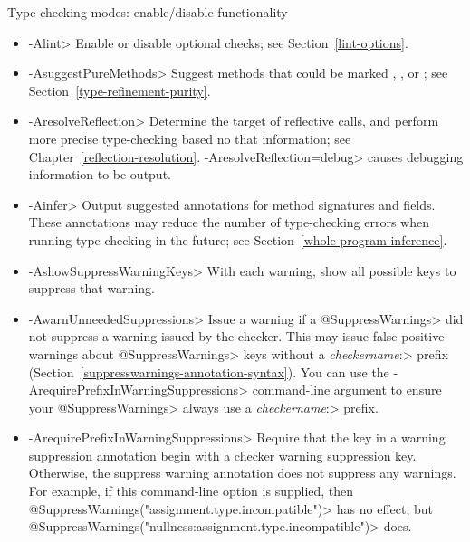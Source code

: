 Type-checking modes:  enable/disable functionality
\begin{itemize}
\item \<-Alint>
  Enable or disable optional checks; see Section~\ref{lint-options}.
\item \<-AsuggestPureMethods>
  Suggest methods that could be marked
  ,
  ,
  or ; see
  Section~\ref{type-refinement-purity}.
\item \<-AresolveReflection>
  Determine the target of reflective calls, and perform more precise
  type-checking based no that information; see
  Chapter~\ref{reflection-resolution}.  \<-AresolveReflection=debug> causes
  debugging information to be output.
\item \<-Ainfer>
  Output suggested annotations for method signatures and fields.
  These annotations may reduce the number of type-checking
  errors when running type-checking in the future; see
  Section~\ref{whole-program-inference}.
\item \<-AshowSuppressWarningKeys>
  With each warning, show all possible keys to suppress that warning.
\item \<-AwarnUnneededSuppressions>
  Issue a warning if a \<@SuppressWarnings> did not suppress a warning
  issued by the checker.  This may issue false positive warnings about
  \<@SuppressWarnings> keys without a \<\emph{checkername}:> prefix
  (Section~\ref{suppresswarnings-annotation-syntax}).  You can use the
  \<-ArequirePrefixInWarningSuppressions> command-line argument to ensure
  your \<@SuppressWarnings> always use a \<\emph{checkername}:> prefix.
\item \<-ArequirePrefixInWarningSuppressions>
  Require that the key in a warning suppression annotation begin with a checker
  warning suppression key.  Otherwise, the suppress warning annotation does not
  suppress any warnings.  For example, if this command-line option is
  supplied, then \<@SuppressWarnings("assignment.type.incompatible")> has no effect, but
  \<@SuppressWarnings("nullness:assignment.type.incompatible")> does.
\end{itemize}

